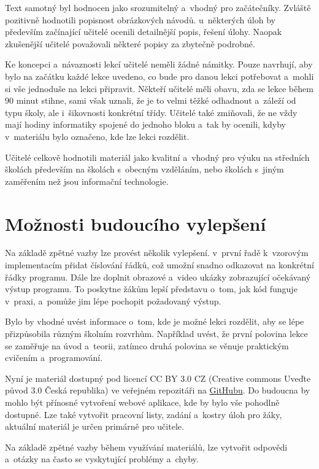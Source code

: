 \documentclass[
  digital,     %
  oneside,     %
  nosansbold,  %
  colorbold, %
  lof,         %
  nolot,         %
]{fithesis4}
\begin{document}
Text samotný byl hodnocen jako srozumitelný a~vhodný pro začátečníky. Zvláště pozitivně hodnotili  popisnost obrázkových návodů. u~některých úloh by především začínající učitelé ocenili detailnější popis, řešení úlohy. Naopak zkušenější učitelé považovali některé popisy za zbytečně podrobné.

Ke koncepci a~návaznosti lekcí učitelé neměli žádné námitky. Pouze navrhují, aby bylo na začátku každé lekce uvedeno, co bude pro danou lekci potřebovat a~mohli si vše jednoduše na lekci připravit. Někteří učitelé měli obavu, zda se lekce během 90 minut stihne, sami však uznali, že je to velmi těžké odhadnout a~záleží od typu školy, ale i~šikovnosti konkrétní třídy.  Učitelé také zmiňovali, že ne vždy mají hodiny informatiky spojené do jednoho bloku a~tak by ocenili, kdyby v~materiálu bylo označeno, kde lze lekci rozdělit. 

Učitelé celkově hodnotili materiál jako kvalitní a~vhodný pro výuku na středních školách především na školách s~obecným vzděláním, nebo školách s~jiným zaměřením než jsou informační technologie.

\section{Možnosti budoucího vylepšení}
Na základě zpětné vazby lze provést několik vylepšení. v~první řadě k~vzorovým implementacím přidat číslování řádků, což umožní snadno odkazovat na konkrétní řádky programu. Dále lze doplnit obrazové a~video ukázky zobrazující očekávaný výstup programu. To poskytne žákům lepší představu o~tom, jak kód funguje v~praxi, a~pomůže jim lépe pochopit požadovaný výstup.

Bylo by vhodné uvést informace o~tom, kde je možné lekci rozdělit, aby se lépe přizpůsobila různým školním rozvrhům. Například uvést, že první polovina lekce se zaměřuje na úvod a~teorii, zatímco druhá polovina se věnuje praktickým cvičením a~programování.

Nyní je materiál dostupný pod licencí CC BY 3.0 CZ (Creative commons Uveďte původ 3.0 Česká republika) ve veřejném repozitáři na \href{https://github.com/denisa-mat/BP-microbit/tree/lekce-00}{GitHubu}. Do budoucna by mohlo být přínosné vytvoření webové aplikace, kde by bylo vše pohodlně dostupné. Lze také vytvořit pracovní listy, zadání a~kostry úloh pro žáky, aktuální materiál je určen primárně pro učitele.

Na základě zpětné vazby během využívání materiálů, lze vytvořit odpovědi a~otázky na často se vyskytující problémy a~chyby.
\end{document}
